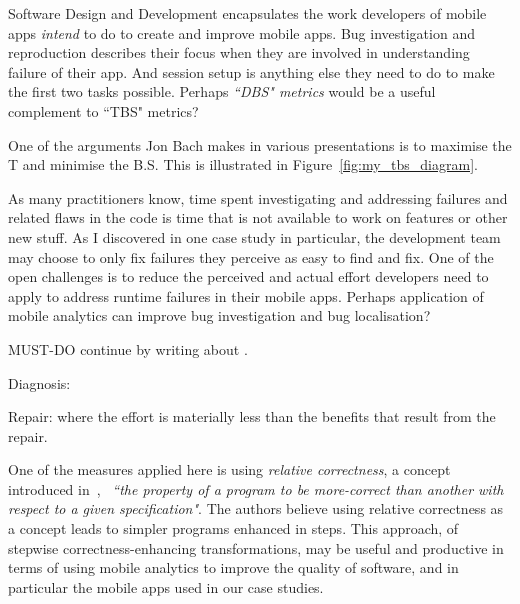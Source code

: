 Software Design and Development encapsulates the work developers of mobile apps \emph{intend} to do to create and improve mobile apps. Bug investigation and reproduction describes their focus when they are involved in understanding failure of their app. And session setup is anything else they need to do to make the first two tasks possible. Perhaps \emph{``DBS" metrics} would be a useful complement to ``TBS" metrics?

One of the arguments Jon Bach makes in various presentations is to maximise the T and minimise the B.S. This is illustrated in Figure~\ref{fig:my_tbs_diagram}.


As many practitioners know, time spent investigating and addressing failures and related flaws in the code is time that is not available to work on features or other new stuff. As I discovered in one case study in particular, the development team may choose to only fix failures they perceive as easy to find and fix. One of the open challenges is to reduce the perceived and actual effort developers need to apply to address runtime failures in their mobile apps. 
%
Perhaps application of mobile analytics can improve bug investigation and bug localisation? 



MUST-DO continue by writing about \citep{avizienis2004_basic_concepts_and_taxonomy}.


Diagnosis:

Repair: where the effort is materially less than the benefits that result from the repair. 


One of the measures applied here is using \emph{relative correctness}, a concept introduced in~\cite{diallo2015_correctness_and_relative_correctness}, ~\emph{``the
property of a program to be more-correct than another with respect to a given specification"}. The authors believe using relative correctness as a concept leads to simpler programs enhanced  in steps. This approach, of stepwise correctness-enhancing transformations, may be useful and productive in terms of using mobile analytics to improve the quality of software, and in particular the mobile apps used in our case studies. 

